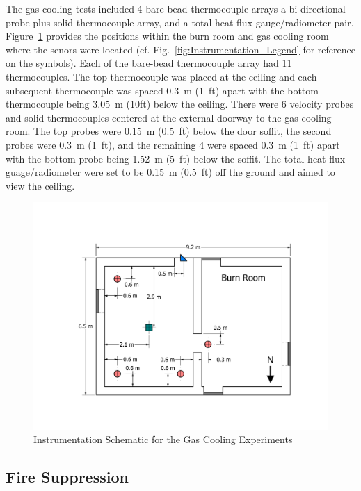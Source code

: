 \documentclass[12pt,oneside]{book}
\begin{document}
The gas cooling tests included 4 bare-bead thermocouple arrays  a bi-directional probe plus solid thermocouple array, and a total heat flux gauge/radiometer pair. Figure~\ref{fig:Gas_Cooling_Instrumentation_Dimensions} provides the positions within the burn room and gas cooling room where the senors were located (cf. Fig.~\ref{fig:Instrumentation_Legend} for reference on the symbols). Each of the bare-bead thermocouple array had 11 thermocouples. The top thermocouple was placed at the ceiling and each subsequent thermocouple was spaced 0.3~m (1~ft) apart with the bottom thermocouple being 3.05~m (10ft) below the ceiling. There were 6 velocity probes and solid thermocouples centered at the external doorway to the gas cooling room. The top probes were 0.15~m (0.5~ft) below the door soffit, the second probes were 0.3~m (1~ft), and the remaining 4 were spaced 0.3~m (1~ft) apart with the bottom probe being 1.52~m (5~ft) below the soffit. The total heat flux guage/radiometer were set to be 0.15~m (0.5~ft) off the ground and aimed to view the ceiling.

\begin{figure}[!ht]
	\includegraphics[width=\columnwidth]{../Figures/Floor_Plans/PDFs/West_Structure/DelCo_2012_West_Structure_Instrumentation}
	\caption{Instrumentation Schematic for the Gas Cooling Experiments}
	\label{fig:Gas_Cooling_Instrumentation_Dimensions}
\end{figure}

\clearpage

\subsection{Fire Suppression}
\label{subsec:Fire_Suppression_Instrumentation}
\end{document}
